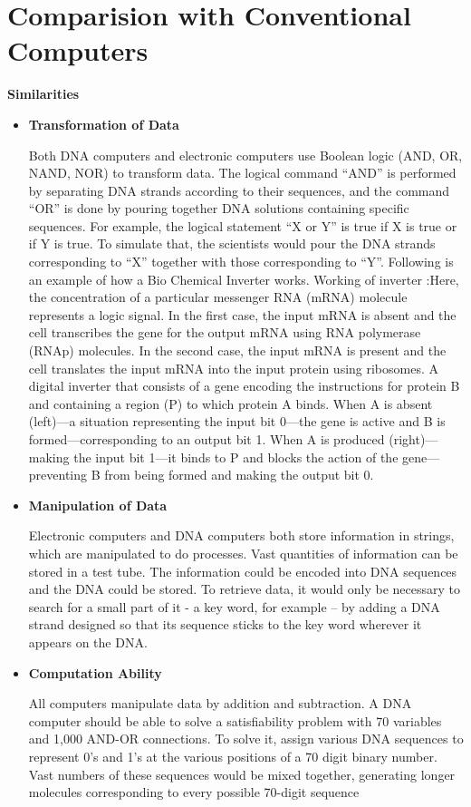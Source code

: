 \documentclass[a4paper]{article}
\begin{document}
\section{Comparision with Conventional Computers}

\textbf{Similarities}

  \begin{itemize}
    \item \textbf{Transformation of Data}

        Both DNA computers and electronic computers use Boolean logic (AND, OR, NAND, NOR) to transform data. The logical command ``AND'' is performed by separating DNA strands according to their sequences, and the command ``OR'' is done by pouring together DNA solutions containing specific sequences. For example, the logical statement ``X or Y'' is true if X is true or if Y is true. To simulate that, the scientists would pour the DNA strands corresponding to ``X'' together with those corresponding to ``Y''. Following is an example of how a Bio Chemical Inverter works.
       Working of inverter :Here, the concentration of a particular messenger RNA (mRNA) molecule represents a logic signal. In the first case, the input mRNA is absent and the cell transcribes the gene for the output mRNA using RNA polymerase (RNAp) molecules. In the second case, the input mRNA is present and the cell translates the input mRNA into the input protein using ribosomes.
      A digital inverter that consists of a gene encoding the instructions for protein B and containing a region (P) to which protein A binds. When A is absent (left)—a situation representing the input bit 0—the gene is active and B is formed—corresponding to an output bit 1. When A is produced (right)—making the input bit 1—it binds to P and blocks the action of the gene—preventing B from being formed and making the output bit 0.

      \item \textbf{Manipulation of Data}

      Electronic computers and DNA computers both store information in strings, which are manipulated to do processes. Vast quantities of information can be stored in a test tube. The information could be encoded into DNA sequences and the DNA could be stored. To retrieve data, it would only be necessary to search for a small part of it - a key word, for example – by adding a DNA strand designed so that its sequence sticks to the key word wherever it appears on the DNA.

      \item \textbf{Computation Ability}

      All computers manipulate data by addition and subtraction. A DNA computer should be able to solve a satisfiability problem with 70 variables and 1,000 AND-OR connections. To solve it, assign various DNA sequences to represent 0’s and 1’s at the various positions of a 70 digit binary number. Vast numbers of these sequences would be mixed together, generating longer molecules corresponding to every possible 70-digit sequence 
  \end{itemize}
\end{document}
